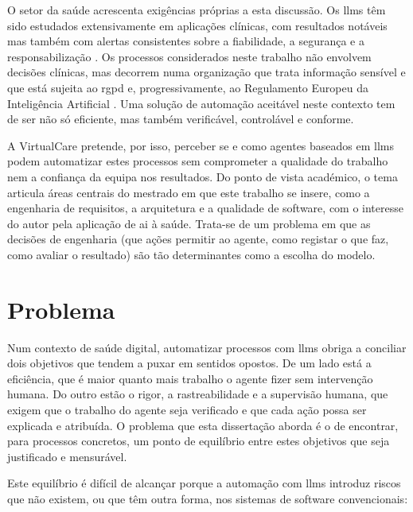 O setor da saúde acrescenta exigências próprias a esta discussão. Os \glspl{llm} têm sido estudados extensivamente em aplicações clínicas, com resultados notáveis mas também com alertas consistentes sobre a fiabilidade, a segurança e a responsabilização \parencite{singhal2023large,thirunavukarasu2023large}. Os processos considerados neste trabalho não envolvem decisões clínicas, mas decorrem numa organização que trata informação sensível e que está sujeita ao \gls{rgpd} \parencite{rgpd2016} e, progressivamente, ao Regulamento Europeu da Inteligência Artificial \parencite{aiact2024}. Uma solução de automação aceitável neste contexto tem de ser não só eficiente, mas também verificável, controlável e conforme.

A VirtualCare pretende, por isso, perceber se e como agentes baseados em \glspl{llm} podem automatizar estes processos sem comprometer a qualidade do trabalho nem a confiança da equipa nos resultados. Do ponto de vista académico, o tema articula áreas centrais do mestrado em que este trabalho se insere, como a engenharia de requisitos, a arquitetura e a qualidade de software, com o interesse do autor pela aplicação de \gls{ai} à saúde. Trata-se de um problema em que as decisões de engenharia (que ações permitir ao agente, como registar o que faz, como avaliar o resultado) são tão determinantes como a escolha do modelo.

\section{Problema}
\label{sec:introducao_problema}

Num contexto de saúde digital, automatizar processos com \glspl{llm} obriga a conciliar dois objetivos que tendem a puxar em sentidos opostos. De um lado está a eficiência, que é maior quanto mais trabalho o agente fizer sem intervenção humana. Do outro estão o rigor, a rastreabilidade e a supervisão humana, que exigem que o trabalho do agente seja verificado e que cada ação possa ser explicada e atribuída. O problema que esta dissertação aborda é o de encontrar, para processos concretos, um ponto de equilíbrio entre estes objetivos que seja justificado e mensurável.

Este equilíbrio é difícil de alcançar porque a automação com \glspl{llm} introduz riscos que não existem, ou que têm outra forma, nos sistemas de software convencionais:

